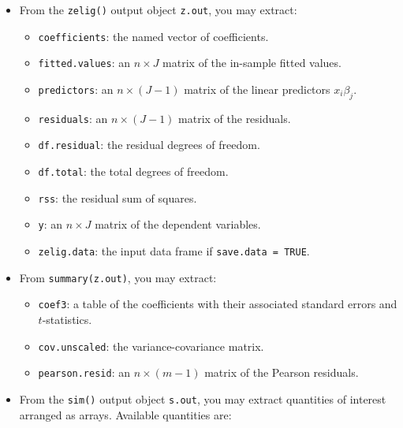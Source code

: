 \begin{itemize}
\item From the {\tt zelig()} output object {\tt z.out}, you may
  extract:
   \begin{itemize}
   \item {\tt coefficients}: the named vector of coefficients.   
   \item {\tt fitted.values}: an $n \times J$ matrix of the in-sample
     fitted values.
   \item {\tt predictors}: an $n \times (J-1)$ matrix of the linear
     predictors $x_i \beta_j$.
   \item {\tt residuals}: an $n \times (J-1)$ matrix of the residuals.  
   \item {\tt df.residual}: the residual degrees of freedom.  
   \item {\tt df.total}: the total degrees of freedom.
   \item {\tt rss}: the residual sum of squares.  
   \item {\tt y}: an $n \times J$ matrix of the dependent variables.
   \item {\tt zelig.data}: the input data frame if {\tt save.data = TRUE}.  
   \end{itemize}

\item From {\tt summary(z.out)}, you may extract:
\begin{itemize}
  \item {\tt coef3}: a table of the coefficients with their associated
    standard errors and $t$-statistics.
  \item {\tt cov.unscaled}: the variance-covariance matrix. 
  \item {\tt pearson.resid}: an $n \times (m-1)$ matrix of the Pearson residuals.  
\end{itemize}

\item From the {\tt sim()} output object {\tt s.out}, you may extract
  quantities of interest arranged as arrays.  Available quantities
  are:  


\end{itemize}
